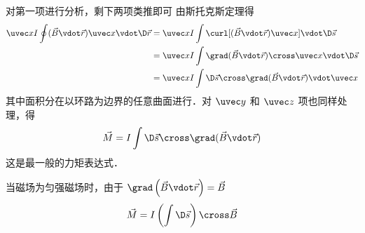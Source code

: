 对第一项进行分析，剩下两项类推即可
由斯托克斯定理得
\begin{equation}
\begin{aligned} 
\uvec x I \oint (\vec B \vdot \vec r)\uvec x \vdot \D\vec r  &= \uvec x I \int \curl [ ( \vec B \vdot \vec r)\uvec x] \vdot \D\vec s \\
&= \uvec x I \int \grad (\vec B \vdot \vec r) \cross \uvec x \vdot \D\vec s \\
&= \uvec x I \int \D\vec s  \cross \grad (\vec B \vdot \vec r) \vdot \uvec x 
\end{aligned} 
\end{equation}
其中面积分在以环路为边界的任意曲面进行．对 $\uvec y$ 和 $\uvec z$ 项也同样处理，得
\begin{equation}
\vec M = I \int \D\vec s\cross\grad(\vec B\vdot\vec r)
\end{equation}
这是最一般的力矩表达式．

当磁场为匀强磁场时，由于 $\grad \left( {\vec B \vdot \vec r} \right) = \vec B$
\begin{equation}
\vec M = I\left( {\int {\D\vec s} } \right) \cross \vec B
\end{equation}







